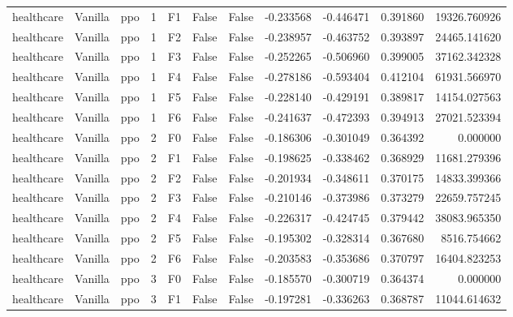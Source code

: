 \begin{tabular}{lllrlllrrrr}
healthcare & Vanilla &       ppo &     1 &  F1 &           False &            False & -0.233568 & -0.446471 & 0.391860 &     19326.760926 \\
healthcare & Vanilla &       ppo &     1 &  F2 &           False &            False & -0.238957 & -0.463752 & 0.393897 &     24465.141620 \\
healthcare & Vanilla &       ppo &     1 &  F3 &           False &            False & -0.252265 & -0.506960 & 0.399005 &     37162.342328 \\
healthcare & Vanilla &       ppo &     1 &  F4 &           False &            False & -0.278186 & -0.593404 & 0.412104 &     61931.566970 \\
healthcare & Vanilla &       ppo &     1 &  F5 &           False &            False & -0.228140 & -0.429191 & 0.389817 &     14154.027563 \\
healthcare & Vanilla &       ppo &     1 &  F6 &           False &            False & -0.241637 & -0.472393 & 0.394913 &     27021.523394 \\
healthcare & Vanilla &       ppo &     2 &  F0 &           False &            False & -0.186306 & -0.301049 & 0.364392 &         0.000000 \\
healthcare & Vanilla &       ppo &     2 &  F1 &           False &            False & -0.198625 & -0.338462 & 0.368929 &     11681.279396 \\
healthcare & Vanilla &       ppo &     2 &  F2 &           False &            False & -0.201934 & -0.348611 & 0.370175 &     14833.399366 \\
healthcare & Vanilla &       ppo &     2 &  F3 &           False &            False & -0.210146 & -0.373986 & 0.373279 &     22659.757245 \\
healthcare & Vanilla &       ppo &     2 &  F4 &           False &            False & -0.226317 & -0.424745 & 0.379442 &     38083.965350 \\
healthcare & Vanilla &       ppo &     2 &  F5 &           False &            False & -0.195302 & -0.328314 & 0.367680 &      8516.754662 \\
healthcare & Vanilla &       ppo &     2 &  F6 &           False &            False & -0.203583 & -0.353686 & 0.370797 &     16404.823253 \\
healthcare & Vanilla &       ppo &     3 &  F0 &           False &            False & -0.185570 & -0.300719 & 0.364374 &         0.000000 \\
healthcare & Vanilla &       ppo &     3 &  F1 &           False &            False & -0.197281 & -0.336263 & 0.368787 &     11044.614632 \\

\end{tabular}
